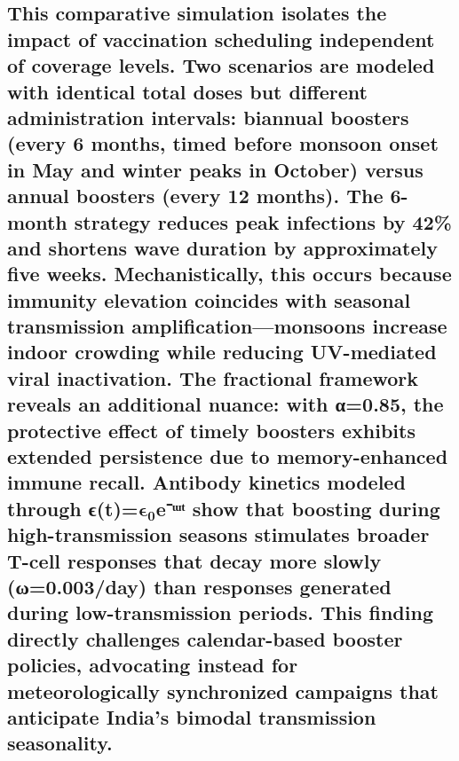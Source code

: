 \documentclass[10pt]{NSP1}
\begin{document}
\subsection*{This comparative simulation isolates the impact of vaccination scheduling independent of coverage levels. Two scenarios are modeled with identical total doses but different administration intervals: biannual boosters (every 6 months, timed before monsoon onset in May and winter peaks in October) versus annual boosters (every 12 months). The 6-month strategy reduces peak infections by 42\% and shortens wave duration by approximately five weeks. Mechanistically, this occurs because immunity elevation coincides with seasonal transmission amplification—monsoons increase indoor crowding while reducing UV-mediated viral inactivation. The fractional framework reveals an additional nuance: with α=0.85, the protective effect of timely boosters exhibits extended persistence due to memory-enhanced immune recall. Antibody kinetics modeled through ϵ(t)=$\mathbf{\epsilon}_{\mathbf{0}}$e⁻ᵚᵗ show that boosting during high-transmission seasons stimulates broader T-cell responses that decay more slowly (ω=0.003/day) than responses generated during low-transmission periods. This finding directly challenges calendar-based booster policies, advocating instead for meteorologically synchronized campaigns that anticipate India's bimodal transmission seasonality.}

\subsection*{}

\subsection*{}

\subsection*{}

\subsection*{}

\subsection*{}

\subsection*{}
\end{document}
